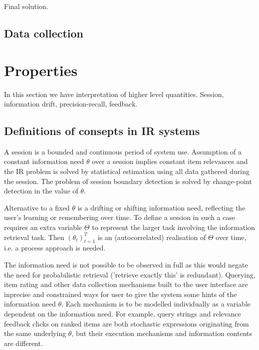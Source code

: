 \documentclass[10pt]{tufte-handout}
\begin{document}
\begin{marginfigure}%
\noindent{}
\caption{Final solution.}
\label{fig:graph5}
\end{marginfigure}

\subsection{Data collection}


\section{Properties}

In this section we have interpretation of higher level quantities. Session, information drift, precision-recall, feedback.

\subsection{Definitions of consepts in IR systems}
A session is a bounded and continuous period of system use. Assumption of a constant information need $\theta$ over a session implies constant item relevances and the IR problem is solved by statistical estimation using all data gathered during the session. The problem of session boundary detection is solved by change-point detection in the value of $\theta$. 

Alternative to a fixed $\theta$ is a drifting or shifting information need, reflecting the user's learning or remembering over time. To define a session in such a case requires an extra variable $\Theta$ to represent the larger task involving the information retrieval task. Then $(\theta_t)_{t=1}^T$ is an (autocorrelated) realisation of $\Theta$ over time, i.e. a process approach is needed.

The information need is not possible to be observed in full as this would negate the need for probabilistic retrieval ('retrieve exactly this' is redundant). Querying, item rating and other data collection mechanisms built to the user interface are inprecise and constrained ways for user to give the system some hints of the information need $\theta$. Each mechanism is to be modelled individually as a variable dependent on the information need. For example, query strings and relevance feedback clicks on ranked items are both stochastic expressions originating from the same underlying $\theta$, but their execution mechanisms and information contents are different.
\end{document}
